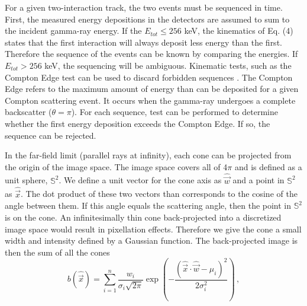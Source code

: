 \documentclass[10pt]{article}
\begin{document}
For a given two-interaction track, the two events must be sequenced in time. First, the measured energy depositions in the detectors are assumed to sum to the incident gamma-ray energy. If the $E_{tot} \leq 256$ keV, the kinematics of Eq. (4) states that the first interaction will always deposit less energy than the first. Therefore the sequence of the events can be known by comparing the energies. If $E_{tot} > 256$ keV, the sequencing will be ambiguous. Kinematic tests, such as the Compton Edge test can be used to discard forbidden sequences \cite{Lehner2004}. The Compton Edge refers to the maximum amount of energy than can be deposited for a given Compton scattering event. It occurs when the gamma-ray undergoes a complete backscatter ($\theta = \pi$). For each sequence, test can be performed to determine whether the first energy deposition exceeds the Compton Edge. If so, the sequence can be rejected. 

In the far-field limit (parallel rays at infinity), each cone can be projected from the origin of the image space. The image space covers all of 4$\pi$ and is defined as a unit sphere, $\mathbb{S}^2$. We define a unit vector for the cone axis as $\hat{\vec{w}}$ and a point in $\mathbb{S}^2$ as $\hat{\vec{x}}$. The dot product of these two vectors than corresponds to the cosine of the angle between them. If this angle equals the scattering angle, then the point in $\mathbb{S}^2$ is on the cone. An infinitesimally thin cone back-projected into a discretized image space would result in pixellation effects. Therefore we give the cone a small width and intensity defined by a Gaussian function. The back-projected image is then the sum of all the cones
%
\begin{equation}
b(\hat{\vec{x}}) = \sum_{i=1}^n \frac{w_i}{\sigma_i \sqrt{2\pi}} \exp\left( -\frac{(\hat{\vec{x}} \cdot \hat{\vec{w}} - \mu_i)^2}{2\sigma_i^2} \right)\,,
\end{equation}
\end{document}
